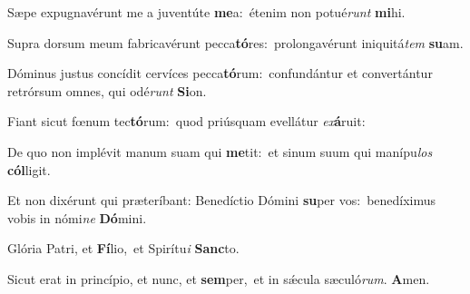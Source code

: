 Sæpe expugnavérunt me a juventúte \textbf{me}a:~\redgreheightstar étenim non potué\textit{runt} \textbf{mi}hi.

Supra dorsum meum fabricavérunt pecca\textbf{tó}res:~\redgreheightstar prolongavérunt iniquitá\textit{tem} \textbf{su}am.

Dóminus justus concídit cervíces pecca\textbf{tó}rum:~\redgreheightstar confundántur et convertántur retrórsum omnes, qui odé\textit{runt} \textbf{Si}on.

Fiant sicut fœnum tec\textbf{tó}rum:~\redgreheightstar quod priúsquam evellátur \textit{ex}\textbf{á}ruit:

De quo non implévit manum suam qui \textbf{me}tit:~\redgreheightstar et sinum suum qui manípu\textit{los} \textbf{cól}ligit.

Et non dixérunt qui præteríbant: Benedíctio Dómini \textbf{su}per vos:~\redgreheightstar benedíximus vobis in nómi\textit{ne} \textbf{Dó}mini.

Glória Patri, et \textbf{Fí}lio,~\redgreheightstar et Spirítu\textit{i} \textbf{Sanc}to.

Sicut erat in princípio, et nunc, et \textbf{sem}per,~\redgreheightstar et in sǽcula sæculó\textit{rum}. \textbf{A}men.


